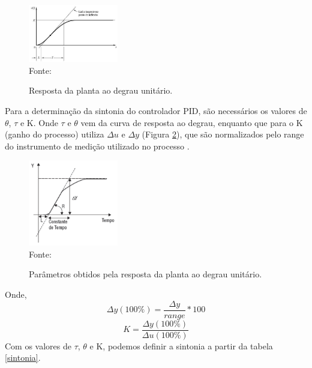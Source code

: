 \documentclass[conference]{IEEEtran}
\begin{document}
\begin{figure}[!http]
    \centering
    \caption{Resposta da planta ao degrau unitário.}
    \includegraphics[width=0.35\textwidth]{imagens/degrau_Z&N.png}\\
    Fonte: \cite{teixeira2010controles}
    \label{figura:degrau}
\end{figure}

Para a determinação da sintonia do controlador PID, são necessários os valores de \(\theta\), \(\tau\) e K. Onde \(\tau\) e \(\theta\) vem da curva de resposta ao degrau, enquanto que para o K (ganho do processo) utiliza \(\Delta u\) e \(\Delta y\) (Figura \ref{figura:constantes}), que são normalizados pelo range do instrumento de medição utilizado no processo \cite{teixeira2010controles}.

\begin{figure}[!http]
    \centering
    \caption{Parâmetros obtidos pela resposta da planta ao degrau unitário.}
    \includegraphics[width=0.35\textwidth]{imagens/constantes_Z&N.png}\\
    Fonte: \cite{teixeira2010controles}
    \label{figura:constantes}
\end{figure}

Onde,
\begin{equation}
    \Delta y  (100\%) = \frac{\Delta y}{range} * 100
    \label{deltay}
\end{equation}
\begin{equation}
    K = \frac{\Delta y (100\%)}{\Delta u (100\%)}
    \label{K}
\end{equation}
\newpage
Com os valores de \(\tau\), \(\theta\) e K, podemos definir a sintonia a partir da tabela \ref{sintonia}.
\end{document}
